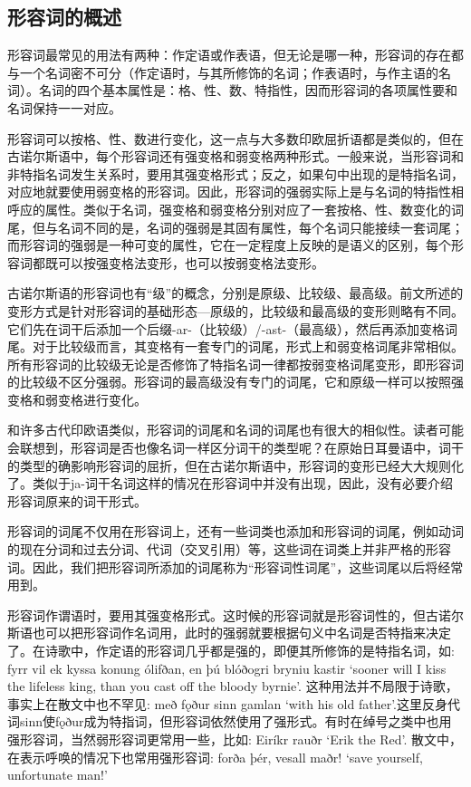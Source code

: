 \subsection{形容词的概述}\label{ux5f62ux5bb9ux8bcdux7684ux6982ux8ff0}

形容词最常见的用法有两种：作定语或作表语，但无论是哪一种，形容词的存在都与一个名词密不可分（作定语时，与其所修饰的名词；作表语时，与作主语的名词）。名词的四个基本属性是：格、性、数、特指性，因而形容词的各项属性要和名词保持一一对应。

形容词可以按格、性、数进行变化，这一点与大多数印欧屈折语都是类似的，但在古诺尔斯语中，每个形容词还有强变格和弱变格两种形式。一般来说，当形容词和非特指名词发生关系时，要用其强变格形式；反之，如果句中出现的是特指名词，对应地就要使用弱变格的形容词。因此，形容词的强弱实际上是与名词的特指性相呼应的属性。类似于名词，强变格和弱变格分别对应了一套按格、性、数变化的词尾，但与名词不同的是，名词的强弱是其固有属性，每个名词只能接续一套词尾；而形容词的强弱是一种可变的属性，它在一定程度上反映的是语义的区别，每个形容词都既可以按强变格法变形，也可以按弱变格法变形。

古诺尔斯语的形容词也有``级''的概念，分别是原级、比较级、最高级。前文所述的变形方式是针对形容词的基础形态---原级的，比较级和最高级的变形则略有不同。它们先在词干后添加一个后缀-ar-（比较级）/-ast-（最高级），然后再添加变格词尾。对于比较级而言，其变格有一套专门的词尾，形式上和弱变格词尾非常相似。所有形容词的比较级无论是否修饰了特指名词一律都按弱变格词尾变形，即形容词的比较级不区分强弱。形容词的最高级没有专门的词尾，它和原级一样可以按照强变格和弱变格进行变化。

和许多古代印欧语类似，形容词的词尾和名词的词尾也有很大的相似性。读者可能会联想到，形容词是否也像名词一样区分词干的类型呢？在原始日耳曼语中，词干的类型的确影响形容词的屈折，但在古诺尔斯语中，形容词的变形已经大大规则化了。类似于ja-词干名词这样的情况在形容词中并没有出现，因此，没有必要介绍形容词原来的词干形式。

形容词的词尾不仅用在形容词上，还有一些词类也添加和形容词的词尾，例如动词的现在分词和过去分词、代词（交叉引用）等，这些词在词类上并非严格的形容词。因此，我们把形容词所添加的词尾称为``形容词性词尾''，这些词尾以后将经常用到。

形容词作谓语时，要用其强变格形式。这时候的形容词就是形容词性的，但古诺尔斯语也可以把形容词作名词用，此时的强弱就要根据句义中名词是否特指来决定了。在诗歌中，作定语的形容词几乎都是强的，即便其所修饰的是特指名词，如:
fyrr vil ek kyssa konung ólifðan, en þú blóðogri bryniu kastir `sooner
will I kiss the lifeless king, than you cast off the bloody byrnie‌'.
这种用法并不局限于诗歌，事实上在散文中也不罕见: með fǫður sinn gamlan
`with his old
father‌'.这里反身代词sinn使fǫður成为特指词，但形容词依然使用了强形式。有时在绰号之类中也用强形容词，当然弱形容词更常用一些，比如:
Eiríkr rauðr `Erik the Red‌'. 散文中，在表示呼唤的情况下也常用强形容词:
forða þér, vesall maðr! `save yourself, unfortunate man!‌'

